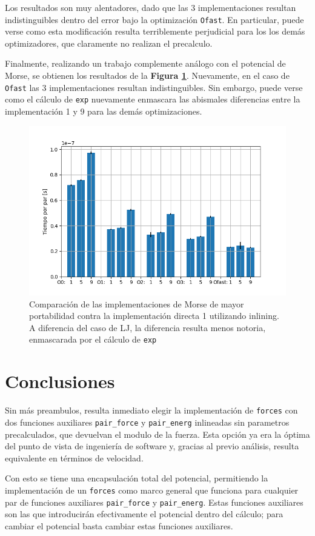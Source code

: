 \documentclass[twoside, 12pt]{article}
\begin{document}
Los resultados son muy alentadores, dado que las 3 implementaciones resultan indistinguibles dentro del error bajo la optimizaci\'on \texttt{Ofast}. En particular, puede verse como esta modificaci\'on resulta terriblemente perjudicial para los los dem\'as optimizadores, que claramente no realizan el precalculo. 

Finalmente, realizando un trabajo complemente an\'alogo con el potencial de Morse, se obtienen los resultados de la \textbf{Figura \ref{fig:CompEsp_morse_inline}}. Nuevamente, en el caso de \texttt{Ofast} las 3 implementaciones resultan indistinguibles. Sin embargo, puede verse como el c\'alculo de \texttt{exp} nuevamente enmascara las abismales diferencias entre la implementaci\'on 1 y 9 para las dem\'as optimizaciones.

\begin{figure}[h]
	\centering
	\includegraphics[trim = 10mm 5mm 10mm 5mm, clip, scale=0.7]{Imagenes/Comp_tiempos_morse_inline.png}
	\caption{Comparaci\'on de las implementaciones de Morse de mayor portabilidad contra la implementaci\'on directa 1 utilizando inlining. A diferencia del caso de LJ, la diferencia resulta menos notoria, enmascarada por el c\'alculo de \texttt{exp}}
	\label{fig:CompEsp_morse_inline}
\end{figure}

\section{Conclusiones}

Sin m\'as preambulos, resulta inmediato elegir la implementaci\'on de \texttt{forces} con dos funciones auxiliares \texttt{pair\_force} y \texttt{pair\_energ} inlineadas sin parametros precalculados, que devuelvan el modulo de la fuerza. Esta opci\'on ya era la \'optima del punto de vista de ingenier\'ia de software y, gracias al previo an\'alisis, resulta equivalente en t\'erminos de velocidad.

Con esto se tiene una encapsulación total del potencial, permitiendo la implementaci\'on de un \texttt{forces} como marco general que funciona para cualquier par de funciones auxiliares \texttt{pair\_force} y \texttt{pair\_energ}. Estas funciones auxiliares son las que introducir\'an efectivamente el potencial dentro del c\'alculo; para cambiar el potencial basta cambiar estas funciones auxiliares.
\end{document}
